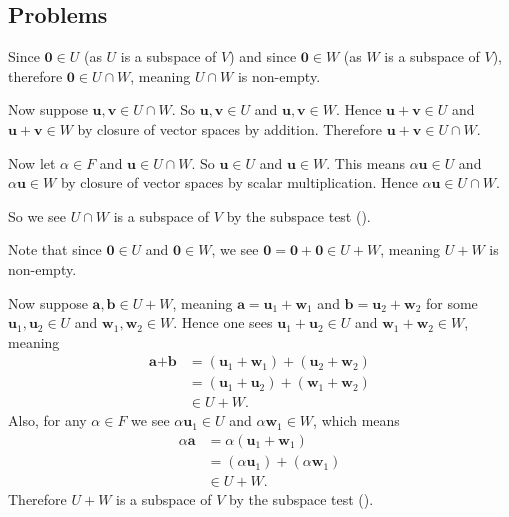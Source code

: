 \subsection*{Problems}
\begin{questions}
    \item \begin{partquestions}{\alph*}
        \item Since $\textbf{0} \in U$ (as $U$ is a subspace of $V$) and since $\textbf{0} \in W$ (as $W$ is a subspace of $V$), therefore $\textbf{0} \in U \cap W$, meaning $U \cap W$ is non-empty.

        Now suppose $\textbf{u}, \textbf{v} \in U \cap W$. So $\textbf{u}, \textbf{v} \in U$ and $\textbf{u}, \textbf{v} \in W$. Hence $\textbf{u} + \textbf{v} \in U$ and $\textbf{u} + \textbf{v} \in W$ by closure of vector spaces by addition. Therefore $\textbf{u} + \textbf{v} \in U \cap W$.

        Now let $\alpha \in F$ and $\textbf{u} \in U \cap W$. So $\textbf{u} \in U$ and $\textbf{u} \in W$. This means $\alpha\textbf{u} \in U$ and $\alpha\textbf{u} \in W$ by closure of vector spaces by scalar multiplication. Hence $\alpha\textbf{u} \in U \cap W$.

        So we see $U \cap W$ is a subspace of $V$ by the subspace test ().

        \item Note that since $\textbf{0} \in U$ and $\textbf{0} \in W$, we see $\textbf{0} = \textbf{0} + \textbf{0} \in U + W$, meaning $U + W$ is non-empty.

        Now suppose $\textbf{a}, \textbf{b} \in U + W$, meaning $\textbf{a} = \textbf{u}_1 + \textbf{w}_1$ and $\textbf{b} = \textbf{u}_2 + \textbf{w}_2$ for some $\textbf{u}_1, \textbf{u}_2 \in U$ and $\textbf{w}_1, \textbf{w}_2 \in W$. Hence one sees $\textbf{u}_1 + \textbf{u}_2 \in U$ and $\textbf{w}_1 + \textbf{w}_2 \in W$, meaning
        \begin{align*}
            \textbf{a} + \textbf{b} &= (\textbf{u}_1 + \textbf{w}_1) + (\textbf{u}_2 + \textbf{w}_2)\\
            &= (\textbf{u}_1 + \textbf{u}_2) + (\textbf{w}_1 + \textbf{w}_2)\\
            &\in U + W.
        \end{align*}
        Also, for any $\alpha \in F$ we see $\alpha\textbf{u}_1 \in U$ and $\alpha\textbf{w}_1 \in W$, which means
        \begin{align*}
            \alpha\textbf{a} &= \alpha(\textbf{u}_1 + \textbf{w}_1)\\
            &= (\alpha\textbf{u}_1) + (\alpha\textbf{w}_1)\\
            &\in U + W.
        \end{align*}
        Therefore $U + W$ is a subspace of $V$ by the subspace test ().
    \end{partquestions}


\end{questions}
